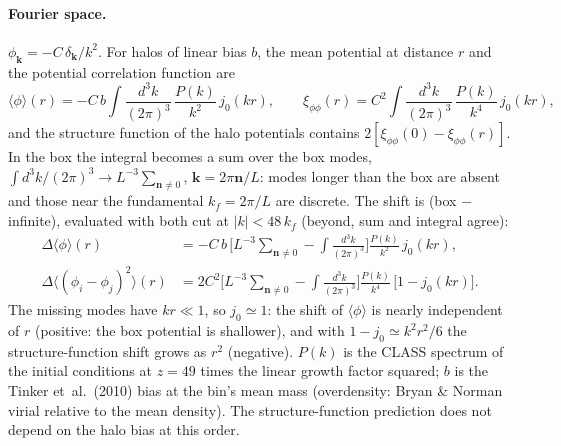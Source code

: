 \paragraph{Fourier space.} $\phi_{\mathbf k} = -C\,\delta_{\mathbf k}/k^2$. For halos of linear bias $b$, the mean
potential at distance $r$ and the potential correlation function are
\begin{equation}
\langle\phi\rangle(r) = -C\,b\int\!\frac{d^3k}{(2\pi)^3}\,\frac{P(k)}{k^2}\,j_0(kr),\qquad
\xi_{\phi\phi}(r) = C^2\int\!\frac{d^3k}{(2\pi)^3}\,\frac{P(k)}{k^4}\,j_0(kr),
\end{equation}
and the structure function of the halo potentials contains $2[\xi_{\phi\phi}(0)-\xi_{\phi\phi}(r)]$. In the box the
integral becomes a sum over the box modes, $\int d^3k/(2\pi)^3\to L^{-3}\sum_{\mathbf n\neq0}$,
$\mathbf k = 2\pi\mathbf n/L$: modes longer than the box are absent and those near the fundamental
$k_f = 2\pi/L$ are discrete. The shift is (box $-$ infinite), evaluated with both cut at $|k| < 48\,k_f$ (beyond,
sum and integral agree):
\begin{align}
\Delta\langle\phi\rangle(r) &= -C\,b\,\Big[L^{-3}\textstyle\sum_{\mathbf n\neq0} - \int\frac{d^3k}{(2\pi)^3}\Big]
\frac{P(k)}{k^2}\,j_0(kr),\\
\Delta\langle(\phi_i-\phi_j)^2\rangle(r) &= 2C^2\Big[L^{-3}\textstyle\sum_{\mathbf n\neq0} - \int\frac{d^3k}{(2\pi)^3}\Big]
\frac{P(k)}{k^4}\,\big[1-j_0(kr)\big].
\end{align}
The missing modes have $kr\ll1$, so $j_0\simeq1$: the shift of $\langle\phi\rangle$ is nearly independent of $r$
(positive: the box potential is shallower), and with $1-j_0\simeq k^2r^2/6$ the structure-function shift grows as
$r^2$ (negative). $P(k)$ is the CLASS spectrum of the initial conditions at $z = 49$ times the linear growth factor
squared; $b$ is the Tinker et~al.\ (2010) bias at the bin's mean mass (overdensity: Bryan \& Norman virial relative to
the mean density). The structure-function prediction does not depend on the halo bias at this order.

